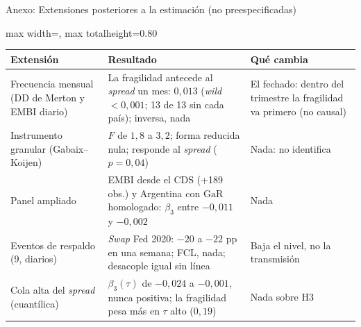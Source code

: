 \documentclass[aspectratio=169]{beamer}
\newcommand{\GaR}{\mathrm{GaR}}
\begin{document}
\begin{frame}{Anexo: Extensiones posteriores a la estimación (no preespecificadas)}
\centering
\footnotesize
\begin{adjustbox}{max width=\textwidth, max totalheight=0.80\textheight}
\begin{tabular}{>{\raggedright\arraybackslash}p{}>{\raggedright\arraybackslash}p{}>{\raggedright\arraybackslash}p{}}
\toprule
Extensión & Resultado & Qué cambia \\
\midrule
Frecuencia mensual (DD de Merton y EMBI diario) & La fragilidad antecede al \textit{spread} un mes: $0{,}013$ (\textit{wild} $<0{,}001$; 13 de 13 sin cada país); inversa, nada & El fechado: dentro del trimestre la fragilidad va primero (no causal) \\
\addlinespace
Instrumento granular (Gabaix--Koijen) & $F$ de $1{,}8$ a $3{,}2$; forma reducida nula; responde al \textit{spread} ($p=0{,}04$) & Nada: no identifica \\
\addlinespace
Panel ampliado & EMBI desde el CDS (+189 obs.) y Argentina con $\GaR$ homologado: $\beta_3$ entre $-0{,}011$ y $-0{,}002$ & Nada \\
\addlinespace
Eventos de respaldo (9, diarios) & \textit{Swap} Fed 2020: $-20$ a $-22$ pp en una semana; FCL, nada; desacople igual sin línea & Baja el nivel, no la transmisión \\
\addlinespace
Cola alta del \textit{spread} (cuantílica) & $\beta_3(\tau)$ de $-0{,}024$ a $-0{,}001$, nunca positiva; la fragilidad pesa más en $\tau$ alto ($0{,}19$) & Nada sobre H3 \\
\bottomrule
\end{tabular}
\end{adjustbox}
\end{frame}
\end{document}
